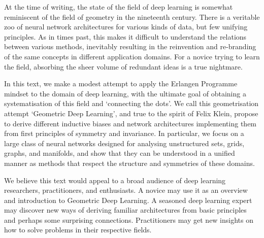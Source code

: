 \documentclass[11pt]{book}              %
\begin{document}


At the time of writing, the state of the field of deep learning is somewhat reminiscent of the field of geometry in the nineteenth century. 
There is a veritable zoo of neural network architectures for various kinds of data, but few unifying principles. 
As in times past, this makes it difficult to understand the relations between various methods, inevitably resulting in the reinvention and re-branding of the same concepts in different application domains.  
%
For a novice trying to learn the field, absorbing the sheer volume of redundant ideas is a true nightmare.  


In this text, we make a modest attempt to apply the Erlangen Programme mindset to the domain of deep learning, with the ultimate goal of obtaining a systematisation of this field and `connecting the dots'. 
%
We call this geometrisation attempt `Geometric Deep Learning', and true to the spirit of Felix Klein, propose to derive different inductive biases and network architectures implementing them from first principles of symmetry and invariance. 
%
%
In particular, we focus on a large class of neural networks designed for analysing unstructured sets, grids, graphs, and manifolds, and show that they can be understood in a unified manner as methods that respect the structure and symmetries of these domains. 
%


We believe this text would appeal to a broad audience of deep learning researchers, practitioners, and enthusiasts. 
%
A novice may use it as an overview and introduction to Geometric Deep Learning. 
%
A seasoned deep learning expert may discover new ways of deriving familiar architectures from basic principles and perhaps some surprising connections.  
%
Practitioners may get new insights on how to solve problems in their respective fields. 
\end{document}
